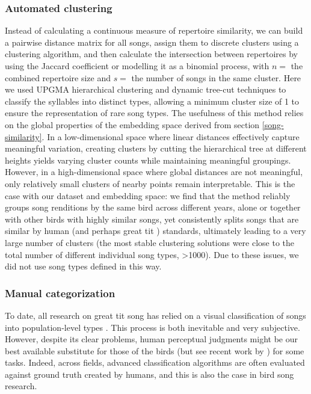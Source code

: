 \documentclass[9pt, twocolumn, twoside]{gsajnl}
\begin{document}
\subsubsection{Automated clustering}

Instead of calculating a continuous measure of repertoire similarity, we can build a pairwise distance matrix for all songs, assign them to discrete clusters using a clustering algorithm, and then calculate the intersection between repertoires by using the Jaccard coefficient or modelling it as a binomial process, with $n = $ the combined repertoire size and $s = $ the number of songs in the same cluster. Here we used UPGMA hierarchical clustering and dynamic tree-cut techniques to classify the syllables into distinct types, allowing a minimum cluster size of 1 to ensure the representation of rare song types. The usefulness of this method relies on the global properties of the embedding space derived from section \ref{song-similarity}. In a low-dimensional space where linear distances effectively capture meaningful variation, creating clusters by cutting the hierarchical tree at different heights yields varying cluster counts while maintaining meaningful groupings. However, in a high-dimensional space where global distances are not meaningful, only relatively small clusters of nearby points remain interpretable. This is the case with our dataset and embedding space: we find that the method reliably groups song renditions by the same bird across different years, alone or together with other birds with highly similar songs, yet consistently splits songs that are similar by human (and perhaps great tit \parencite{falls1982}) standards, ultimately leading to a very large number of clusters (the most stable clustering solutions were close to the total number of different individual song types, >1000). Due to these issues, we did not use song types defined in this way.

\subsubsection{Manual categorization}

To date, all research on great tit song has relied on a visual classification of songs into population-level types \parencite{baker1987, falls1982, fayet2014, hutfluss2022, mcgregor1982, mcgregor1981, mcgregor1982b}. This process is both inevitable and very subjective. However, despite its clear problems, human perceptual judgments might be our best available substitute for those of the birds (but see recent work by \cite{morfi2021, zandberg2022}) for some tasks. Indeed, across fields, advanced classification algorithms are often evaluated against ground truth created by humans, and this is also the case in bird song research.
\end{document}
